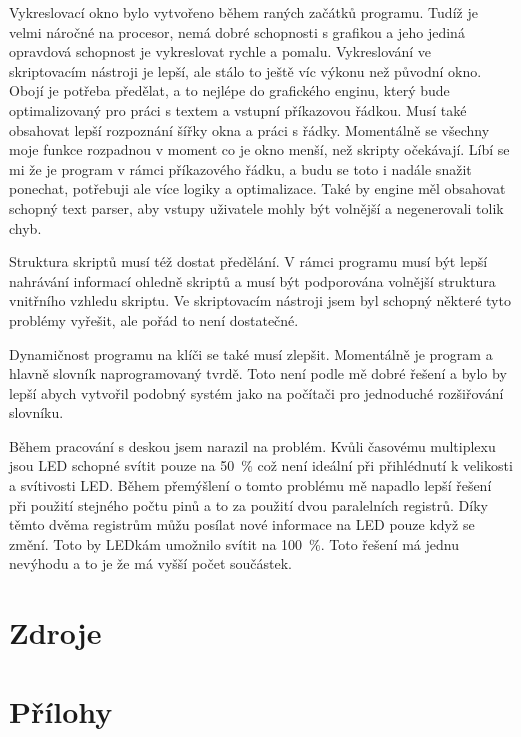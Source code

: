 \documentclass[12pt,a4paper]{article}
\begin{document}
Vykreslovací okno bylo vytvořeno během raných začátků programu. Tudíž je velmi náročné na procesor, nemá dobré schopnosti s grafikou a jeho jediná opravdová schopnost je vykreslovat rychle a pomalu. Vykreslování ve skriptovacím nástroji je lepší, ale stálo to ještě víc výkonu než původní okno. Obojí je potřeba předělat, a to nejlépe do grafického enginu, který bude optimalizovaný pro práci s textem a vstupní příkazovou řádkou. Musí také obsahovat lepší rozpoznání šířky okna a práci s řádky. Momentálně se všechny moje funkce rozpadnou v moment co je okno menší, než skripty očekávají. Líbí se mi že je program v rámci příkazového řádku, a budu se toto i nadále snažit ponechat, potřebuji ale více logiky a optimalizace. Také by engine měl obsahovat schopný text parser, aby vstupy uživatele mohly být volnější a negenerovali tolik chyb.

Struktura skriptů musí též dostat předělání. V rámci programu musí být lepší nahrávání informací ohledně skriptů a musí být podporována volnější struktura vnitřního vzhledu skriptu. Ve skriptovacím nástroji jsem byl schopný některé tyto problémy vyřešit, ale pořád to není dostatečné.

Dynamičnost programu na klíči se také musí zlepšit. Momentálně je program a hlavně slovník naprogramovaný tvrdě. Toto není podle mě dobré řešení a bylo by lepší abych vytvořil podobný systém jako na počítači pro jednoduché rozšiřování slovníku.

Během pracování s deskou jsem narazil na problém. Kvůli časovému multiplexu jsou LED schopné svítit pouze na 50~\% což není ideální při přihlédnutí k velikosti a svítivosti LED. Během přemýšlení o tomto problému mě napadlo lepší řešení při použití stejného počtu pinů a to za použití dvou paralelních registrů. Díky těmto dvěma registrům můžu posílat nové informace na LED pouze když se změní. Toto by LEDkám umožnilo svítit na 100~\%. Toto řešení má jednu nevýhodu a to je že má vyšší počet součástek.

\section{Zdroje}
\section{Přílohy}
\end{document}
